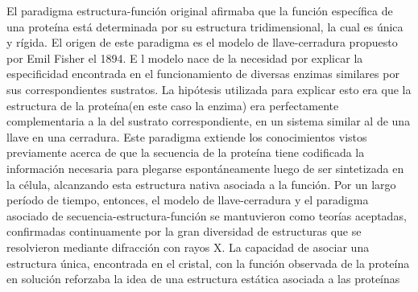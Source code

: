 El paradigma estructura-función original afirmaba que la función específica de una proteína está determinada por su estructura tridimensional, la cual es única y rígida. 
El origen de este paradigma es el modelo de llave-cerradura propuesto por Emil Fisher el 1894. E
l modelo nace de la necesidad por explicar la especificidad encontrada en el funcionamiento de diversas enzimas similares por sus correspondientes sustratos. 
La hipótesis utilizada para explicar esto era que la estructura de la proteína(en este caso la enzima) era perfectamente complementaria a la del sustrato correspondiente, en un sistema similar al de una llave en una cerradura.
Este paradigma extiende los conocimientos vistos previamente acerca de que la secuencia de la proteína tiene codificada la información necesaria para plegarse espontáneamente luego de ser sintetizada en la célula,
alcanzando esta estructura nativa asociada a la función.
Por un largo período de tiempo, entonces, el modelo de llave-cerradura y el paradigma asociado de secuencia-estructura-función se mantuvieron como teorías aceptadas, confirmadas continuamente por la
gran diversidad de estructuras que se resolvieron mediante difracción con rayos X. 
La capacidad de asociar una estructura única, encontrada en el cristal, con la función observada de la proteína en solución reforzaba la idea de una estructura estática asociada a las proteínas

